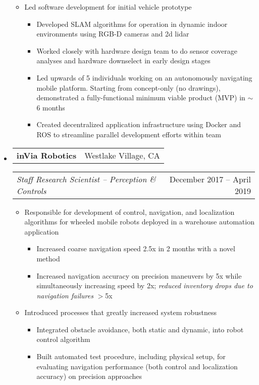 \documentclass[letterpaper,18pt]{article}
\makeatletter
\newcommand{\resitem}[1]{\item #1 \vspace{-2pt}}
\newcommand{\headerrow}[2]{%
  \hspace*{-\labelsep}%
  \begin{tabular*}{\dimexpr\linewidth+\labelsep}{@{\extracolsep{\fill}}lr@{}}
    #1 &
    #2 \\
  \end{tabular*}%
}
\makeatother
\begin{document}
\begin{itemize}[label={},leftmargin=*,noitemsep]
{\begin{itemize}[noitemsep]
\begin{itemize}[noitemsep]
                \resitem{Conducted $\sim$90\% of interviews initially, including technical panel interviews for hardware team candidates, but was able to delegate much of this responsibility as the team grew.}
                \resitem{Grew the team from 1 (me) to 12+ in 8 months.  Total team, including hardware and industrial design, grew to 35+}
        \end{itemize}
        \resitem{Led software development for initial vehicle prototype}
        \begin{itemize}[noitemsep]
                \resitem{Developed SLAM algorithms for operation in dynamic indoor environments using RGB-D cameras and 2d lidar}
                \resitem{Worked closely with hardware design team to do sensor coverage analyses and hardware downselect in early design stages}
                \resitem{Led upwards of 5 individuals working on an autonomously navigating mobile platform.  Starting from concept-only (no drawings), demonstrated a fully-functional minimum viable product (MVP) in $\sim$6 months}
		        \resitem{Created decentralized application infrastructure using Docker and ROS to streamline parallel development efforts within team}
        \end{itemize}
	\end{itemize}
	}
\item
	\headerrow{\textbf{inVia Robotics}}{Westlake Village, CA}
	\headerrow{\emph{Staff Research Scientist -- Perception \& Controls}}{December 2017 -- April 2019}
	{\small
	\begin{itemize}[noitemsep]
		\resitem{Responsible for development of control, navigation, and localization algorithms for wheeled mobile robots deployed in a warehouse automation application}
        \begin{itemize}[noitemsep]
                \resitem{Increased coarse navigation speed 2.5x in 2 months with a novel method}
                \resitem{Increased navigation accuracy on precision maneuvers by 5x while simultaneously increasing speed by 2x; \textit{reduced inventory drops due to navigation failures} $>$5x}
        \end{itemize}
		\resitem{Introduced processes that greatly increased system robustness}
        \begin{itemize}[noitemsep]
                \resitem{Integrated obstacle avoidance, both static and dynamic, into robot control algorithm}
                \resitem{Built automated test procedure, including physical setup, for evaluating navigation performance (both control and localization accuracy) on precision approaches}

\end{itemize}
\end{itemize}}
\end{itemize}
\end{document}
